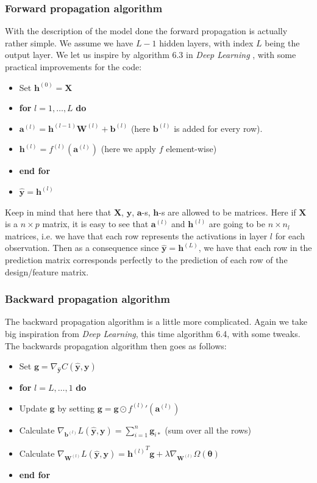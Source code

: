\documentclass{article}
\begin{document}
\subsubsection{Forward propagation algorithm}
\label{forwardprop}
With the description of the model done the forward propagation is actually
rather simple. We assume we have $L-1$ hidden layers, with index $L$ being the
output layer. We let us inspire by algorithm 6.3 in \textit{Deep Learning}
\cite[p.~212]{goodfellow2016deep}, with some practical improvements for the code:
\begin{itemize}
      \item Set $\bm{h}^{(0)} = \bm{X}$
      \item \textbf{for} $l = 1, \dots, L$ \textbf{do}
      \item $\bm{a}^{(l)} = \bm{h}^{(l-1)} \bm{W}^{(l)} + \bm{b}^{(l)}$ (here $\bm{b}^{(l)}$ is added for every row).
      \item $\bm{h}^{(l)} = f^{(l)}(\bm{a}^{(l)})$ (here we apply $f$ element-wise)
      \item \textbf{end for}
      \item $\hat{\bm{y}} = \bm{h}^{(l)}$
\end{itemize}
Keep in mind that here that $\bm{X}$, $\bm{y}$, $\bm{a}$-s, $\bm{h}$-s are
allowed to be matrices. Here if $\bm{X}$ is a $n \times p$ matrix, it is easy to
see that $\bm{a}^{(l)}$ and $\bm{h}^{(l)}$ are going to be $n \times n_l$
matrices, i.e. we have that each row represents the activations in layer $l$ for
each observation. Then as a consequence since $\hat{\bm{y}} = \bm{h}^{(L)}$, we
have that each row in the prediction matrix corresponds perfectly to the
prediction of each row of the design/feature matrix.

\subsubsection{Backward propagation algorithm}
\label{backprop}
The backward propagation algorithm is a little more complicated. Again we take
big inspiration from \textit{Deep Learning}, this time algorithm 6.4, with some
tweaks. The backwards propagation algorithm then goes as follows:
\begin{itemize}
      \item Set $\bm{g} = \nabla_{\hat{\bm{y}}} C(\hat{\bm{y}}, \bm{y})$
      \item \textbf{for} $l = L, \dots, 1$ \textbf{do}
      \item Update $\bm{g}$ by setting $\bm{g} = \bm{g} \odot f^{(l)} \prime (\bm{a}^{(l)})$
      \item Calculate $\nabla_{\bm{b}^{(l)}} L(\hat{\bm{y}}, \bm{y}) = \sum_{i=1}^n \bm{g}_{i *}$ (sum over all the rows)
      \item Calculate $\nabla_{\bm{W}^{(l)}} L(\hat{\bm{y}}, \bm{y}) = {\bm{h}^{(l)}}^T \bm{g} + \lambda \nabla_{\bm{W}^{(l)}} \Omega(\bm{\theta})$
      \item \textbf{end for}
\end{itemize}
\end{document}
